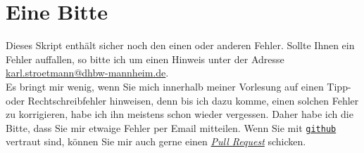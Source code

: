 \section{Eine Bitte}
Dieses Skript enth\"alt sicher noch den einen oder anderen Fehler.  Sollte Ihnen ein Fehler auffallen, so bitte ich
um einen Hinweis unter der Adresse
\\[0.2cm]
\hspace*{1.3cm}
\href{mailto:karl.stroetmann@dhbw-mannheim.de}{karl.stroetmann@dhbw-mannheim.de}.
\\[0.2cm]
Es bringt mir wenig, wenn Sie mich innerhalb meiner Vorlesung auf einen Tipp- oder
Rechtschreibfehler hinweisen, denn bis ich dazu komme, einen solchen Fehler zu korrigieren, habe ich
ihn meistens schon wieder vergessen.  Daher habe ich die Bitte, dass Sie mir etwaige Fehler per Email mitteilen.
Wenn Sie mit \href{http://github.com}{\texttt{github}} vertraut sind, k\"onnen Sie mir auch gerne einen
\href{https://help.github.com/articles/using-pull-requests}{\textsl{Pull Request}} schicken.


